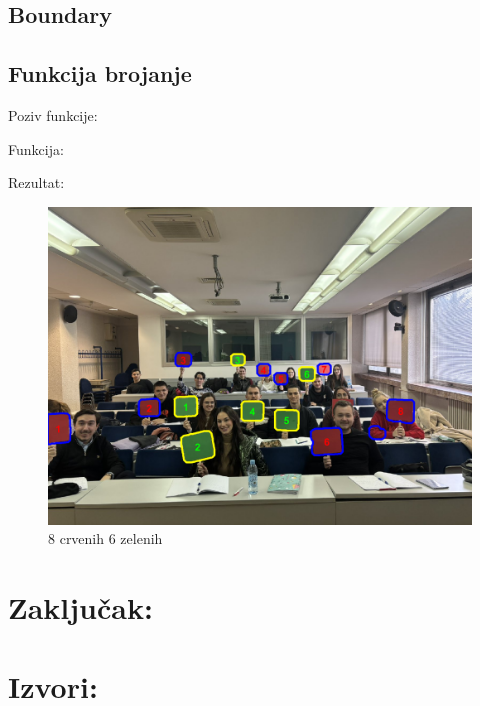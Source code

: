 \documentclass[a4paper,12pt]{article}
\begin{document}
\subsection{Boundary}




\subsection{Funkcija brojanje}

Poziv funkcije:



Funkcija:


\newpage
Rezultat:

\begin{figure}[h]
    \centering
    \includegraphics[width=\textwidth]{studenti.png}
    \caption{8 crvenih 6 zelenih}
    \label{fig:example}
\end{figure}
\section{Zaključak:}
\newpage
\section{Izvori:}
\end{document}
